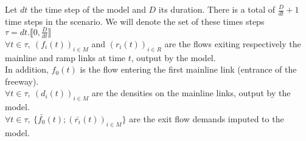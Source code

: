 Let $dt$ the time step of the model and $D$ its duration. There is a total of $\frac{D}{dt}+1$ time steps in the scenario. We will denote the set of these times steps $\tau=dt.\llbracket 0,\frac{D}{dt}\rrbracket $\\
$\forall t \in \tau,\ (f_{i}(t))_{i\in{M}}$ and $(r_{i}(t))_{i\in{R}}$ are the flows exiting respectively the mainline and ramp links at time $t$, output by the model.\\
In addition, $f_{0}(t)$ is the flow entering the first mainline link (entrance of the freeway).\\
$\forall t \in \tau,\ (d_{i}(t))_{i\in{M}} $ are the densities on the mainline links, output by the model.\\
$\forall t \in \tau,\ \big\{\bar{f_{0}}(t) ; (\bar{r_{i}}(t))_{i\in{M}} \big\} $ are the exit flow demands imputed to the model.\\